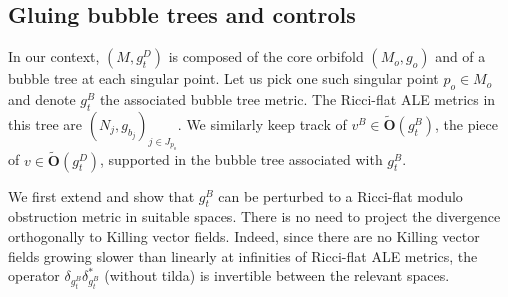 \documentclass[11pt,reqno]{amsart}
\numberwithin{equation}{section}
\theoremstyle{definition}
\theoremstyle{remark}
\begin{document}
\subsection{Gluing bubble trees and controls}\label{sec:gluing trees}

In our context, $(M,g^D_{t })$ is composed of the core orbifold $(M_o,g_o)$ and of a bubble tree at each singular point. Let us pick one such singular point $p_o\in M_o$ and denote $g^B_{t }$ the associated bubble tree metric. The Ricci-flat ALE metrics in this tree are $(N_j,g_{b_j})_{j\in J_{p_o}}$. We similarly keep track of $v ^B\in \tilde{\mathbf{O}}(g^B_{t })$, the piece of $v \in\tilde{\mathbf{O}}(g^D_{t })$, supported in the bubble tree associated with $g^B_{t }$. 

We first extend \cite[Theorem 4.6]{ozu2} and show that $g^B_{t }$ can be perturbed to a Ricci-flat modulo obstruction metric in suitable spaces. There is no need to project the divergence orthogonally to Killing vector fields. Indeed, since there are no Killing vector fields growing slower than linearly at infinities of Ricci-flat ALE metrics, the operator ${\delta}_{g^B_{t }}\delta_{g^B_{t }}^*$ (without tilda) is invertible between the relevant spaces.
\end{document}
